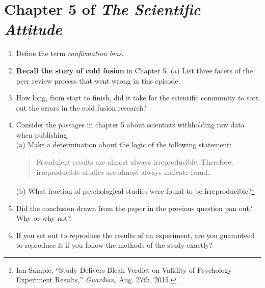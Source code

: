 \documentclass[12pt]{article}
\begin{document}
\maketitle

\section{Chapter 5 of \textit{The Scientific Attitude}}

\begin{enumerate}
\item Define the term \textit{confirmation bias}. \\ \vspace{0.5cm}
\item \textbf{Recall the story of cold fusion} in Chapter 5.  (a) List three facets of the peer review process that went wrong in this episode. \\ \vspace{2cm}
\item How long, from start to finish, did it take for the scientific community to sort out the errors in the cold fusion research? \\ \vspace{1cm}
\item Consider the passages in chapter 5 about scientists withholding raw data when publishing. \\
(a) Make a determination about the logic of the following statement:
\begin{quote}
Fraudulent results are almost always irreproducible.  Therefore, irreproducible studies are almost always indicate fraud.
\end{quote}
(b) What fraction of psychological studies were found to be irreproducible?\footnote{Ian Sample, ``Study Delivers Bleak Verdict on Validity of Psychology Experiment Results,'' \textit{Guardian}, Aug. 27th, 2015.} \\ \vspace{1cm}
\item Did the conclusion drawn from the paper in the previous question pan out?  Why or why not? \\ \vspace{1cm}
\item If you set out to reproduce the results of an experiment, are you guaranteed to reproduce it if you follow the methods of the study exactly?
\end{enumerate}
\end{document}
